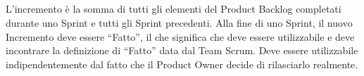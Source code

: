 
\subsection*{\color{SteelBlue}{Incremento}}
\label{sec:increment}
L'incremento \`e la somma di tutti gli elementi del Product Backlog completati durante uno 
Sprint e tutti gli Sprint precedenti. Alla fine di uno Sprint, il nuovo Incremento deve 
essere ``Fatto'', il che significa che deve essere utilizzabile e deve incontrare la 
definizione di ``Fatto'' data dal Team Scrum. Deve essere utilizzabile indipendentemente dal 
fatto che il Product Owner decide di rilasciarlo realmente.

